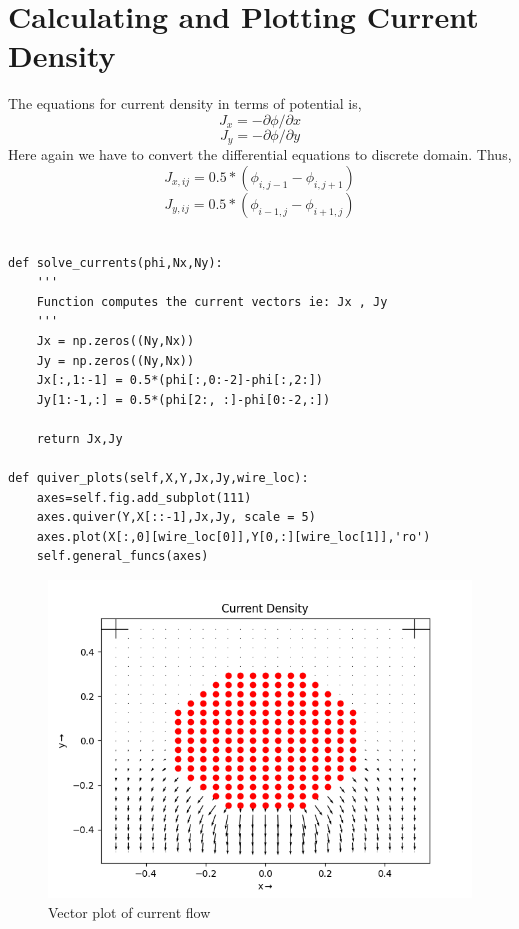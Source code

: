 \documentclass{article}
\begin{document}
\section{Calculating and Plotting Current Density}
The equations for current density in terms of potential is,
\begin{equation}
    J_x = -\partial\phi/\partial x
\end{equation}
\begin{equation}
    J_y = -\partial\phi/\partial y
\end{equation}
Here again we have to convert the differential equations to discrete domain. Thus,
\begin{equation}
    J_{x,ij} = 0.5*(\phi_{i,j-1} - \phi_{i,j+1})
\end{equation}
\begin{equation}
    J_{y,ij} = 0.5*(\phi_{i-1,j} - \phi_{i+1,j})
\end{equation}
\begin{lstlisting}

def solve_currents(phi,Nx,Ny):
    '''
    Function computes the current vectors ie: Jx , Jy
    '''
    Jx = np.zeros((Ny,Nx))
    Jy = np.zeros((Ny,Nx))
    Jx[:,1:-1] = 0.5*(phi[:,0:-2]-phi[:,2:])
    Jy[1:-1,:] = 0.5*(phi[2:, :]-phi[0:-2,:])

    return Jx,Jy

def quiver_plots(self,X,Y,Jx,Jy,wire_loc):
    axes=self.fig.add_subplot(111)
    axes.quiver(Y,X[::-1],Jx,Jy, scale = 5)
    axes.plot(X[:,0][wire_loc[0]],Y[0,:][wire_loc[1]],'ro')
    self.general_funcs(axes)

\end{lstlisting}
\begin{figure}[ht!]
\centering
\includegraphics[scale=0.6]{plots/Current Density.png}
\caption{Vector plot of current flow}
\label{Vector plot of current flow}
\end{figure}
\end{document}
